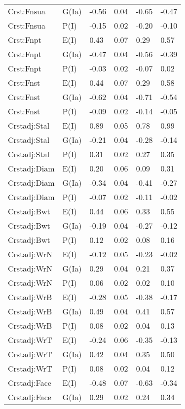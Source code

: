 \begin{center}
\begin{longtable}{|p{1.1in}|p{0.7in}|p{0.7in}|p{0.6in}|p{0.6in}|p{0.6in}|}
  Crst:Fnsua & G(Ia) & -0.56 & 0.04 & -0.65 & -0.47 \\ 
  Crst:Fnsua & P(I) & -0.15 & 0.02 & -0.20 & -0.10 \\ 
  Crst:Fnpt & E(I) & 0.43 & 0.07 & 0.29 & 0.57 \\ 
  Crst:Fnpt & G(Ia) & -0.47 & 0.04 & -0.56 & -0.39 \\ 
  Crst:Fnpt & P(I) & -0.03 & 0.02 & -0.07 & 0.02 \\ 
  Crst:Fnst & E(I) & 0.44 & 0.07 & 0.29 & 0.58 \\ 
  Crst:Fnst & G(Ia) & -0.62 & 0.04 & -0.71 & -0.54 \\ 
  Crst:Fnst & P(I) & -0.09 & 0.02 & -0.14 & -0.05 \\ 
  Crstadj:Stal & E(I) & 0.89 & 0.05 & 0.78 & 0.99 \\ 
  Crstadj:Stal & G(Ia) & -0.21 & 0.04 & -0.28 & -0.14 \\ 
  Crstadj:Stal & P(I) & 0.31 & 0.02 & 0.27 & 0.35 \\ 
  Crstadj:Diam & E(I) & 0.20 & 0.06 & 0.09 & 0.31 \\ 
  Crstadj:Diam & G(Ia) & -0.34 & 0.04 & -0.41 & -0.27 \\ 
  Crstadj:Diam & P(I) & -0.07 & 0.02 & -0.11 & -0.02 \\ 
  Crstadj:Bwt & E(I) & 0.44 & 0.06 & 0.33 & 0.55 \\ 
  Crstadj:Bwt & G(Ia) & -0.19 & 0.04 & -0.27 & -0.12 \\ 
  Crstadj:Bwt & P(I) & 0.12 & 0.02 & 0.08 & 0.16 \\ 
  Crstadj:WrN & E(I) & -0.12 & 0.05 & -0.23 & -0.02 \\ 
  Crstadj:WrN & G(Ia) & 0.29 & 0.04 & 0.21 & 0.37 \\ 
  Crstadj:WrN & P(I) & 0.06 & 0.02 & 0.02 & 0.10 \\ 
  Crstadj:WrB & E(I) & -0.28 & 0.05 & -0.38 & -0.17 \\ 
  Crstadj:WrB & G(Ia) & 0.49 & 0.04 & 0.41 & 0.57 \\ 
  Crstadj:WrB & P(I) & 0.08 & 0.02 & 0.04 & 0.13 \\ 
  Crstadj:WrT & E(I) & -0.24 & 0.06 & -0.35 & -0.13 \\ 
  Crstadj:WrT & G(Ia) & 0.42 & 0.04 & 0.35 & 0.50 \\ 
  Crstadj:WrT & P(I) & 0.08 & 0.02 & 0.04 & 0.12 \\ 
  Crstadj:Face & E(I) & -0.48 & 0.07 & -0.63 & -0.34 \\ 
  Crstadj:Face & G(Ia) & 0.29 & 0.02 & 0.24 & 0.34 \\ 

\end{longtable}
\end{center}
